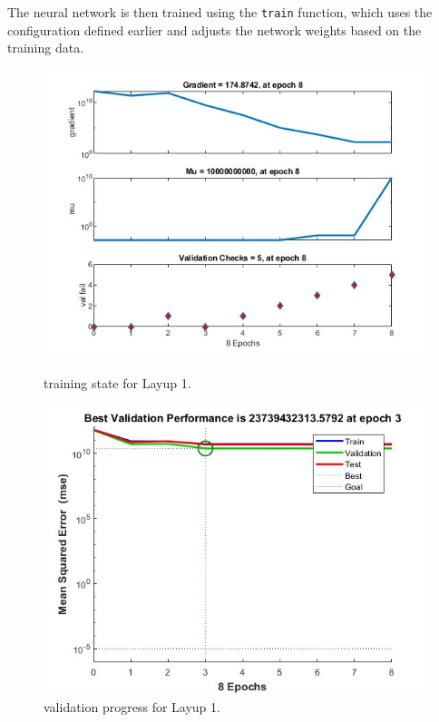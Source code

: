 The neural network is then trained using the \texttt{train} function, which uses the configuration defined earlier and adjusts the network weights based on the training data.


\begin{figure}[h]
    \centering
    \begin{minipage}{0.45\textwidth}
        \centering
        \includegraphics[width=\linewidth]{train_1.jpg}
        \caption{training state for Layup 1.}
    \end{minipage}
    \hfill
    \begin{minipage}{0.45\textwidth}
        \centering
        \includegraphics[width=\linewidth]{train_11.jpg}
        \caption{validation progress for Layup 1.}
    \end{minipage}
\end{figure}

